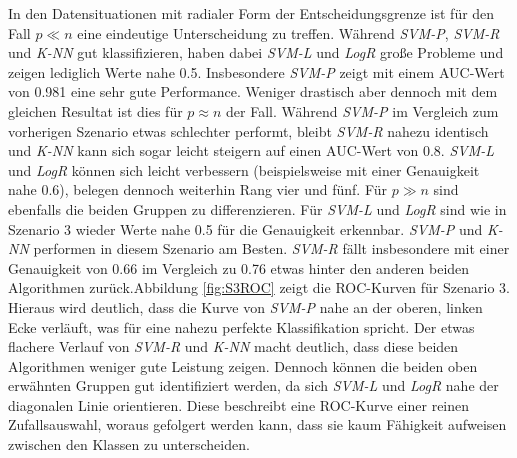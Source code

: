 \documentclass[
]{article}
\begin{document}
In den Datensituationen mit radialer Form der Entscheidungsgrenze ist
für den Fall \(p \ll n\) eine eindeutige Unterscheidung zu treffen.
Während \textit{SVM-P}, \textit{SVM-R} und \textit{K-NN} gut
klassifizieren, haben dabei \textit{SVM-L} und \textit{LogR} große
Probleme und zeigen lediglich Werte nahe 0.5. Insbesondere
\textit{SVM-P} zeigt mit einem AUC-Wert von 0.981 eine sehr gute
Performance. Weniger drastisch aber dennoch mit dem gleichen Resultat
ist dies für \(p \approx n\) der Fall. Während \textit{SVM-P} im
Vergleich zum vorherigen Szenario etwas schlechter performt, bleibt
\textit{SVM-R} nahezu identisch und \textit{K-NN} kann sich sogar leicht
steigern auf einen AUC-Wert von 0.8. \textit{SVM-L} und \textit{LogR}
können sich leicht verbessern (beispielsweise mit einer Genauigkeit nahe
0.6), belegen dennoch weiterhin Rang vier und fünf. Für \(p \gg n\) sind
ebenfalls die beiden Gruppen zu differenzieren. Für \textit{SVM-L} und
\textit{LogR} sind wie in Szenario 3 wieder Werte nahe 0.5 für die
Genauigkeit erkennbar. \textit{SVM-P} und \textit{K-NN} performen in
diesem Szenario am Besten. \textit{SVM-R} fällt insbesondere mit einer
Genauigkeit von 0.66 im Vergleich zu 0.76 etwas hinter den anderen
beiden Algorithmen zurück.\newline Abbildung \ref{fig:S3ROC} zeigt die
ROC-Kurven für Szenario 3. Hieraus wird deutlich, dass die Kurve von
\textit{SVM-P} nahe an der oberen, linken Ecke verläuft, was für eine
nahezu perfekte Klassifikation spricht. Der etwas flachere Verlauf von
\textit{SVM-R} und \textit{K-NN} macht deutlich, dass diese beiden
Algorithmen weniger gute Leistung zeigen. Dennoch können die beiden oben
erwähnten Gruppen gut identifiziert werden, da sich \textit{SVM-L} und
\textit{LogR} nahe der diagonalen Linie orientieren. Diese beschreibt
eine ROC-Kurve einer reinen Zufallsauswahl, woraus gefolgert werden
kann, dass sie kaum Fähigkeit aufweisen zwischen den Klassen zu
unterscheiden.
\end{document}
